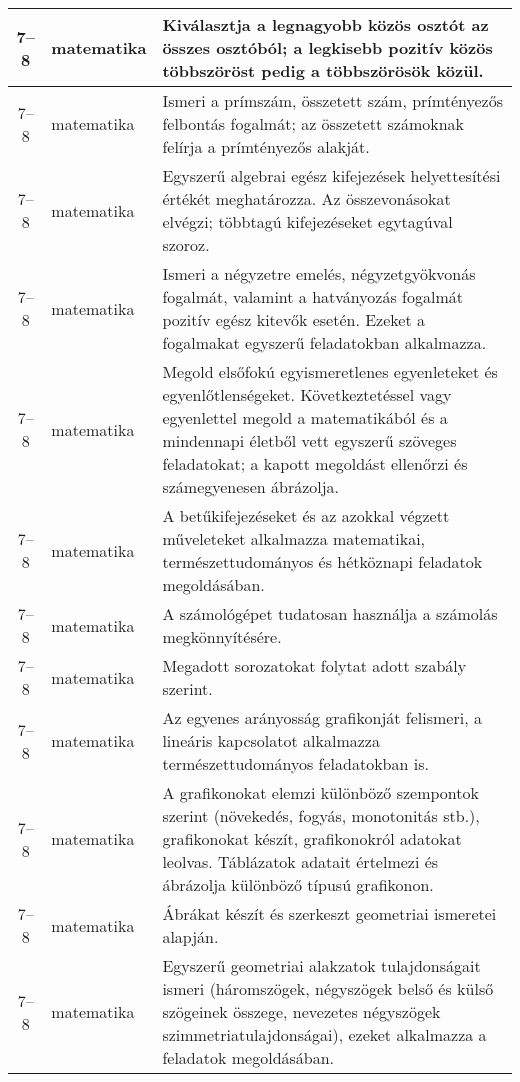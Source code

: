 \begin{small}
\begin{longtable}{c | p{2cm} |  p{11cm} }
              7--8 & matematika & Kiválasztja a legnagyobb közös osztót az összes osztóból; a legkisebb pozitív közös többszöröst pedig a többszörösök közül. \\ \hline
              7--8 & matematika & Ismeri a prímszám, összetett szám, prímtényezős felbontás fogalmát; az összetett számoknak felírja a prímtényezős alakját. \\ \hline
              7--8 & matematika & Egyszerű algebrai egész kifejezések helyettesítési értékét meghatározza. Az összevonásokat elvégzi; többtagú kifejezéseket egytagúval szoroz. \\ \hline
              7--8 & matematika & Ismeri a négyzetre emelés, négyzetgyökvonás fogalmát, valamint a hatványozás fogalmát pozitív egész kitevők esetén. Ezeket a fogalmakat egyszerű feladatokban alkalmazza. \\ \hline
              7--8 & matematika & Megold elsőfokú egyismeretlenes egyenleteket és egyenlőtlenségeket. Következtetéssel vagy egyenlettel megold a matematikából és a mindennapi életből vett egyszerű szöveges feladatokat; a kapott megoldást ellenőrzi és számegyenesen ábrázolja. \\ \hline
              7--8 & matematika & A betűkifejezéseket és az azokkal végzett műveleteket alkalmazza matematikai, természettudományos és hétköznapi feladatok megoldásában. \\ \hline
              7--8 & matematika & A számológépet tudatosan használja a számolás megkönnyítésére. \\ \hline
              7--8 & matematika & Megadott sorozatokat folytat adott szabály szerint. \\ \hline
              7--8 & matematika & Az egyenes arányosság grafikonját felismeri, a lineáris kapcsolatot alkalmazza természettudományos feladatokban is. \\ \hline
              7--8 & matematika & A grafikonokat elemzi különböző szempontok szerint (növekedés, fogyás, monotonitás stb.), grafikonokat készít, grafikonokról adatokat leolvas. Táblázatok adatait értelmezi és ábrázolja különböző típusú grafikonon. \\ \hline
              7--8 & matematika & Ábrákat készít és szerkeszt geometriai ismeretei alapján. \\ \hline
              7--8 & matematika & Egyszerű geometriai alakzatok tulajdonságait ismeri (háromszögek, négyszögek belső és külső szögeinek összege, nevezetes négyszögek szimmetriatulajdonságai), ezeket alkalmazza a feladatok megoldásában. \\ \hline

\end{longtable}
\end{small}
